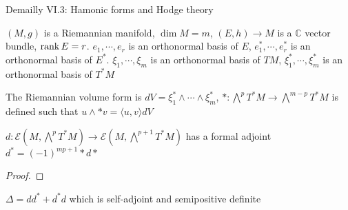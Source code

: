 \documentclass[../main.tex]{subfiles}
\begin{document}
Demailly VI.3: Hamonic forms and Hodge theory

$(M,g)$ is a Riemannian manifold, $\dim M=m$, $(E,h)\to M$ is a $\mathbb C$ vector bundle, $\operatorname{rank} E=r$. $e_1,\cdots, e_r$ is an orthonormal basis of $E$, $e_1^*,\cdots, e_r^*$ is an orthonormal basis of $E^*$. $\xi_1,\cdots,\xi_m$ is an orthonormal basis of $TM$, $\xi_1^*,\cdots,\xi_m^*$ is an orthonormal basis of $T^*M$

\begin{definition}
The Riemannian volume form is $dV=\xi_1^*\wedge\cdots\wedge\xi_m^*$, $*:\bigwedge^pT^*M\to\bigwedge^{m-p}T^*M$ is defined such that $u\wedge*v=\langle u,v\rangle dV$
\end{definition}

\begin{theorem}
$d:\mathcal E(M,\bigwedge^pT^*M)\to\mathcal E(M,\bigwedge^{p+1}T^*M)$ has a formal adjoint $d^*=(-1)^{mp+1}*d*$
\end{theorem}

\begin{proof}

\end{proof}

\begin{definition}
$\Delta=dd^*+d^*d$ which is self-adjoint and semipositive definite
\end{definition}

\begin{example}

\end{example}
\end{document}
